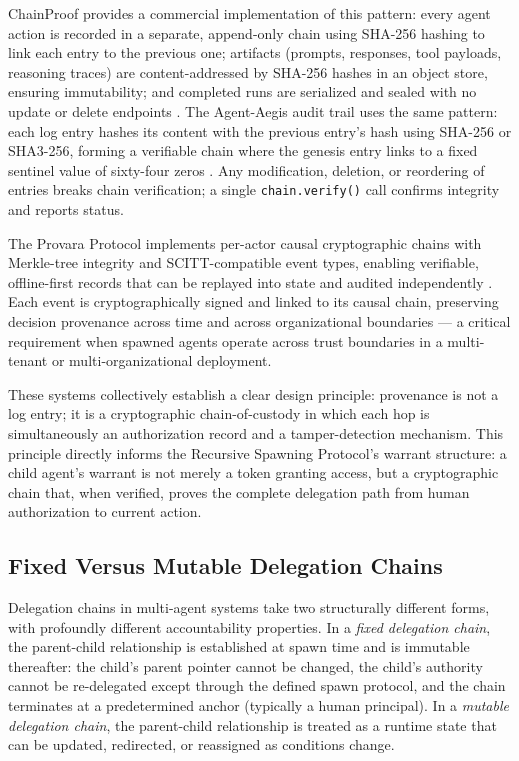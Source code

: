 ChainProof provides a commercial implementation of this pattern: every agent action is recorded in a separate, append-only chain using SHA-256 hashing to link each entry to the previous one; artifacts (prompts, responses, tool payloads, reasoning traces) are content-addressed by SHA-256 hashes in an object store, ensuring immutability; and completed runs are serialized and sealed with no update or delete endpoints \cite{chainproof2025}. The Agent-Aegis audit trail uses the same pattern: each log entry hashes its content with the previous entry's hash using SHA-256 or SHA3-256, forming a verifiable chain where the genesis entry links to a fixed sentinel value of sixty-four zeros \cite{agent-aegis2025}. Any modification, deletion, or reordering of entries breaks chain verification; a single \texttt{chain.verify()} call confirms integrity and reports status.

The Provara Protocol implements per-actor causal cryptographic chains with Merkle-tree integrity and SCITT-compatible event types, enabling verifiable, offline-first records that can be replayed into state and audited independently \cite{provara2025}. Each event is cryptographically signed and linked to its causal chain, preserving decision provenance across time and across organizational boundaries --- a critical requirement when spawned agents operate across trust boundaries in a multi-tenant or multi-organizational deployment.

These systems collectively establish a clear design principle: provenance is not a log entry; it is a cryptographic chain-of-custody in which each hop is simultaneously an authorization record and a tamper-detection mechanism. This principle directly informs the Recursive Spawning Protocol's warrant structure: a child agent's warrant is not merely a token granting access, but a cryptographic chain that, when verified, proves the complete delegation path from human authorization to current action.

\subsection{Fixed Versus Mutable Delegation Chains}

Delegation chains in multi-agent systems take two structurally different forms, with profoundly different accountability properties. In a \emph{fixed delegation chain}, the parent-child relationship is established at spawn time and is immutable thereafter: the child's parent pointer cannot be changed, the child's authority cannot be re-delegated except through the defined spawn protocol, and the chain terminates at a predetermined anchor (typically a human principal). In a \emph{mutable delegation chain}, the parent-child relationship is treated as a runtime state that can be updated, redirected, or reassigned as conditions change.

